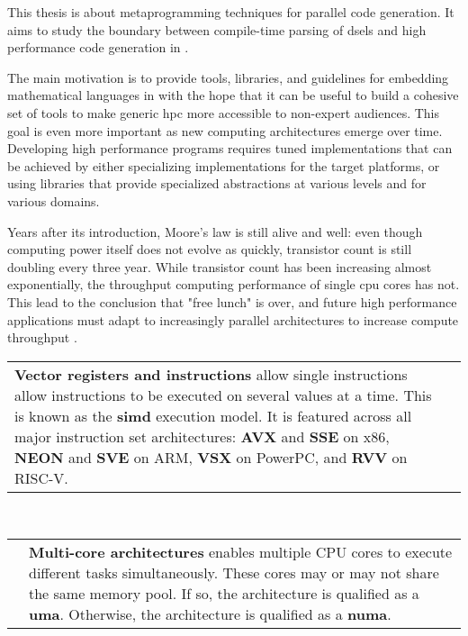 \documentclass[main]{subfiles}
\begin{document}
This thesis is about metaprogramming techniques for parallel code generation.
It aims to study the boundary between compile-time parsing of
\glspl{dsel} and high performance code generation in \cpp.

The main motivation is to provide tools, libraries, and guidelines for embedding
mathematical languages in \cpp with the hope that it can be useful to build a
cohesive set of tools to make generic \gls{hpc} more accessible
to non-expert audiences. This goal is even more important as new computing
architectures emerge over time. Developing high performance programs requires
tuned implementations that can be achieved by either specializing
implementations for the target platforms, or using libraries that provide
specialized abstractions at various levels and for various domains.

Years after its introduction, Moore's law is still alive and well:
even though computing power itself does not evolve as quickly,
transistor count is still doubling every three year.
While transistor count has been increasing almost exponentially,
the throughput computing performance of single \gls{cpu} cores has not.
This lead to the conclusion that "free lunch" is over, and future
high performance applications must adapt to increasingly parallel architectures
to increase compute throughput
\cite{concurrency-revolution, doi:10.1142/S0129626404001829}.

\begin{center}
\begin{tabular}{p{} p{}}
\textbf{Vector registers and instructions} allow single instructions allow
instructions to be executed on several values at a time. This is known as
the \textbf{\gls{simd}} execution model. It is featured across all major
instruction set architectures:
\textbf{AVX} and \textbf{SSE} on x86, \textbf{NEON} and \textbf{SVE} on ARM,
\textbf{VSX} on PowerPC, and \textbf{RVV} on RISC-V.
&
\raisebox{-.925\height}{}
\end{tabular}
\end{center}

\\

\begin{center}
\begin{tabular}{p{} p{}}
\raisebox{-.925\height}{}
&
\textbf{Multi-core architectures} enables multiple CPU cores to execute
different tasks simultaneously. These cores may or may not share the same
memory pool. If so, the architecture is qualified as a \textbf{\gls{uma}}.
Otherwise, the architecture is qualified as a \textbf{\gls{numa}}.
\end{tabular}
\end{center}
\end{document}

